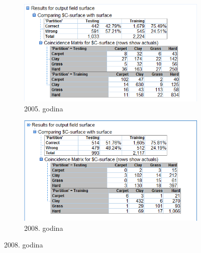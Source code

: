 \documentclass[a4paper]{article}
\begin{document}
\begin{figure}[H]
	\begin{subfigure}[h]{0.35\textwidth}
		\begin{center}
			\includegraphics[scale=0.50]{Klasifikacija/C50/Analysis_Surface2005.png}
		\end{center}
		\caption{2005. godina}
		\label{fig:MatricaKnfuzijeC502005}
	\end{subfigure}
	\hspace{2.5cm}
	\begin{subfigure}[h]{0.35\textwidth}
		\begin{center}
			\includegraphics[scale=0.45]{Klasifikacija/C50/Analysis_Surface2008.png}
		\end{center}
		\caption{2008. godina}
		\label{fig:MatricaKnfuzijeC502008}
	\end{subfigure}
	

\end{figure}
\end{document}
